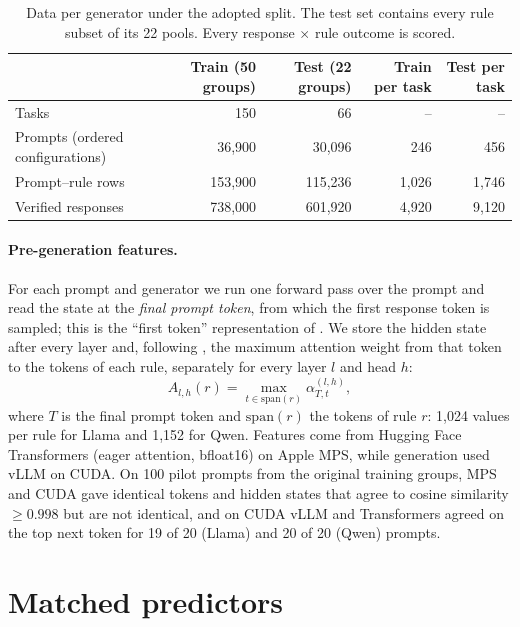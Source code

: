 \documentclass{article}
\begin{document}
\begin{table}[t]
\centering\small
\caption{Data per generator under the adopted split. The test set contains every rule subset of its 22 pools.
Every response $\times$ rule outcome is scored.}
\label{tab:counts}
\setlength{\tabcolsep}{6pt}
\begin{tabular}{lrrrr}
\toprule
 & Train (50 groups) & Test (22 groups) & Train per task & Test per task \\
\midrule
Tasks & 150 & 66 & -- & -- \\
Prompts (ordered configurations) & 36,900 & 30,096 & 246 & 456 \\
Prompt--rule rows & 153,900 & 115,236 & 1,026 & 1,746 \\
Verified responses & 738,000 & 601,920 & 4,920 & 9,120 \\
\bottomrule
\end{tabular}
\end{table}

\paragraph{Pre-generation features.} For each prompt and generator we run one forward pass over the prompt and read the
state at the \emph{final prompt token}, from which the first response token is sampled; this is the ``first token''
representation of \citet{heo2025know}. We store the hidden state after every layer and, following
\citet{yuksekgonul2024attention}, the maximum attention weight from that token to the tokens of each rule, separately
for every layer $l$ and head $h$:
\begin{equation}
A_{l,h}(r)=\max_{t\in\mathrm{span}(r)}\alpha^{(l,h)}_{T,t},
\label{eq:maxattn}
\end{equation}
where $T$ is the final prompt token and $\mathrm{span}(r)$ the tokens of rule $r$: 1,024 values per rule for Llama and
1,152 for Qwen. Features come from Hugging Face Transformers (eager attention, bfloat16) on Apple MPS, while
generation used vLLM on CUDA. On 100 pilot prompts from the original training groups, MPS and CUDA gave identical tokens and
hidden states that agree to cosine similarity $\ge0.998$ but are not identical, and on CUDA vLLM and Transformers
agreed on the top next token for 19 of 20 (Llama) and 20 of 20 (Qwen) prompts.

\section{Matched predictors}
\label{sec:methods}
\end{document}
